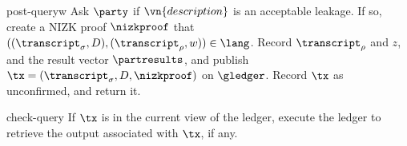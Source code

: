 \begin{protocolsketch}{\kachina}
\begin{receivesketch}{post-query}{w}
    Ask $\party$ if $\vn{description}$ is an acceptable leakage. If so, create a
    NIZK proof $\nizkproof$ that $((\transcript_\sigma, D), (\transcript_\rho, w))
    \in \lang$. Record $\transcript_\rho$ and $z$, and the result vector $\partresults$, and
    publish $\tx = (\transcript_\sigma, D, \nizkproof)$ on $\gledger$. Record
    $\tx$ as unconfirmed, and return it.
  \end{receivesketch}

  \begin{receivesketch}{check-query}{\tx}
    If $\tx$ is in the current view of the ledger, execute the ledger to
      retrieve the output associated with $\tx$, if any.
  \end{receivesketch}
\end{protocolsketch}

